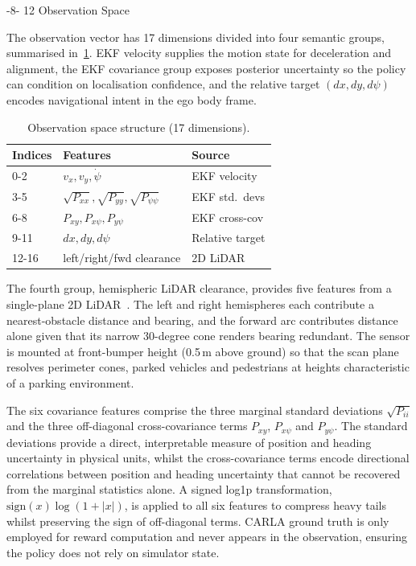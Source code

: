 \documentclass{sig-alternate}
\makeatletter
\renewcommand\subsection{\@startsection{subsection}{2}{\z@}%
    {-8\p@ \@plus -2\p@ \@minus -\p@}%
    {12\p@}%
    {\secfnt}}
\makeatother
\begin{document}
\subsection{Observation Space}

The observation vector has 17 dimensions divided into four semantic groups, summarised in~\cref{tab:obs_space}. EKF velocity supplies the motion state for deceleration and alignment, the EKF covariance group exposes posterior uncertainty so the policy can condition on localisation confidence, and the relative target $(dx, dy, d\psi)$ encodes navigational intent in the ego body frame.

\begin{table}[htbp]
    \centering
    \caption{Observation space structure (17 dimensions).\label{tab:obs_space}}
    \begin{tabular}{lll}
        \toprule
        \textbf{Indices} & \textbf{Features} & \textbf{Source} \\
        \midrule
        0-2   & $v_x, v_y, \dot{\psi}$ & EKF velocity \\
        3-5   & $\sqrt{P_{xx}}, \sqrt{P_{yy}}, \sqrt{P_{\psi\psi}}$ & EKF std.\ devs \\
        6-8   & $P_{xy}, P_{x\psi}, P_{y\psi}$ & EKF cross-cov \\
        9-11  & $dx, dy, d\psi$ & Relative target \\
        12-16 & left/right/fwd clearance & 2D LiDAR \\
        \bottomrule
    \end{tabular}
\end{table}

The fourth group, hemispheric LiDAR clearance, provides five features from a single-plane 2D LiDAR~\cite{sick2026tim571}. The left and right hemispheres each contribute a nearest-obstacle distance and bearing, and the forward arc contributes distance alone given that its narrow 30-degree cone renders bearing redundant. The sensor is mounted at front-bumper height (0.5\,m above ground) so that the scan plane resolves perimeter cones, parked vehicles and pedestrians at heights characteristic of a parking environment.

The six covariance features comprise the three marginal standard deviations $\sqrt{P_{ii}}$ and the three off-diagonal cross-covariance terms $P_{xy}$, $P_{x\psi}$ and $P_{y\psi}$. The standard deviations provide a direct, interpretable measure of position and heading uncertainty in physical units, whilst the cross-covariance terms encode directional correlations between position and heading uncertainty that cannot be recovered from the marginal statistics alone. A signed log1p transformation, $\mathrm{sign}(x)\log(1+|x|)$, is applied to all six features to compress heavy tails whilst preserving the sign of off-diagonal terms. CARLA ground truth is only employed for reward computation and never appears in the observation, ensuring the policy does not rely on simulator state.
\end{document}
